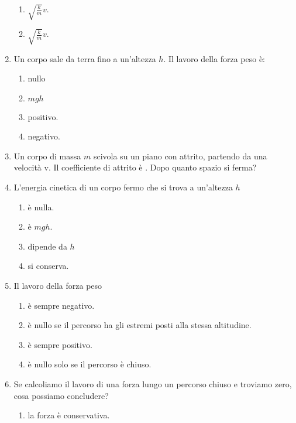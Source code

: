 \documentclass{article}
\begin{document}
\begin{enumerate}
\begin{enumerate}[label=\Alph*.]
    \item $\sqrt{\frac{k}{m}}v$.
    \item $\sqrt{\frac{k}{m}}v$.
  \end{enumerate}
  \item Un corpo sale da terra fino a un'altezza $h$. Il lavoro della forza peso è:
  \begin{enumerate}[label=\Alph*.]
    \item nullo
    \item $mgh$
    \item positivo.
    \item negativo.
  \end{enumerate}
  \item Un corpo di massa $m$ scivola su un piano con attrito, partendo da una velocità v. Il coefficiente di attrito è \mu. Dopo quanto spazio si ferma?
  \begin{enumerate}[label=\Alph*.]
    \item $\frac{1}{2}v^2-\mu g$.
    \item $\frac{v^2}{2g\mu}}$.
    \item $\frac{1}{2}v^2+\mu g$.
    \item $\frac{2v^2}{g\mu}}$.
  \end{enumerate}
  \item L'energia cinetica di un corpo fermo che si trova a un'altezza $h$
  \begin{enumerate}[label=\Alph*.]
    \item è nulla.
    \item è $mgh$.
    \item dipende da $h$
    \item si conserva.
  \end{enumerate}
  \item Il lavoro della forza peso
  \begin{enumerate}[label=\Alph*.]
    \item è sempre negativo.
    \item è nullo se il percorso ha gli estremi posti alla stessa altitudine.
    \item è sempre positivo.
    \item è nullo solo se il percorso è chiuso.
  \end{enumerate}
  \item Se calcoliamo il lavoro di una forza lungo un percorso chiuso e troviamo zero, cosa possiamo concludere?
  \begin{enumerate}[label=\Alph*.]
    \item la forza è conservativa.

\end{enumerate}
\end{enumerate}
\end{document}
